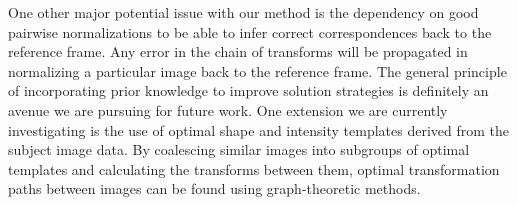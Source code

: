 \documentclass{llncs}
\begin{document}
One other major potential issue with our method is the dependency on 
good pairwise normalizations to be able to infer correct correspondences
back to the reference frame.  Any error in the chain of transforms 
will be propagated in normalizing a particular image back to the 
reference frame. The general principle of incorporating prior knowledge 
to improve solution strategies is definitely an avenue we are pursuing
for future work.  One extension we are currently investigating is the 
use of optimal shape and intensity templates derived from the subject
image data.  By coalescing similar images into subgroups of optimal templates and calculating
the transforms between them, optimal transformation paths between images can be found
using graph-theoretic methods.



\end{document}
